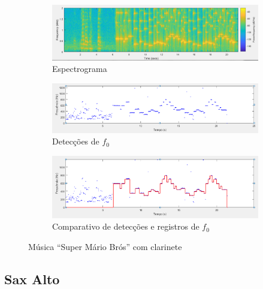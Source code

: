 \begin{figure}

\begin{subfigure}{1\textwidth}
	\includegraphics[width=\linewidth]{pasta1_figuras/clarinete-mario-2.png}
	\caption{Espectrograma}
	\label{fig-clarinete-mario-2}
\end{subfigure}

\begin{subfigure}{1\textwidth}
	\includegraphics[width=\linewidth]{pasta1_figuras/clarinete-mario-3.png}
	\caption{Detecções de $f_0$}
	\label{fig-clarinete-mario-3}
\end{subfigure}

\begin{subfigure}{1\textwidth}
	\includegraphics[width=\linewidth]{pasta1_figuras/clarinete-mario-4.png}
	\caption{Comparativo de detecções e registros de $f_0$}
	\label{fig-clarinete-mario-4}
\end{subfigure}
	\caption{Música ``Super Mário Brós'' com clarinete}
\end{figure}




\subsection{Sax Alto}

